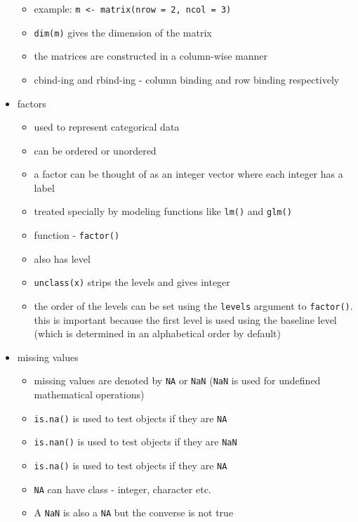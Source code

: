 \documentclass[11pt,fancy]{elegantbook}
\begin{document}
\begin{itemize}
\begin{itemize}
              \item example: \texttt{m <- matrix(nrow = 2, ncol = 3)}
              \item \texttt{dim(m)} gives the dimension of the matrix
              \item the matrices are constructed in a column-wise manner
              \item cbind-ing and rbind-ing - column binding and row binding respectively
          \end{itemize}
    \item factors
          \begin{itemize}
              \item used to represent categorical data
              \item can be ordered or unordered
              \item a factor can be thought of as an integer vector where each integer has a label
              \item treated specially by modeling functions like \texttt{lm()} and \texttt{glm()}
              \item function - \texttt{factor()}
              \item also has level
              \item \texttt{unclass(x)} strips the levels and gives integer
              \item the order of the levels can be set using the \texttt{levels} argument to \texttt{factor()}. this is important because the first level is used using the baseline level (which is determined in an alphabetical order by default)
          \end{itemize}
    \item missing values
          \begin{itemize}
              \item missing values are denoted by \texttt{NA} or \texttt{NaN} (\texttt{NaN} is used for undefined mathematical operations)
              \item \texttt{is.na()} is used to test objects if they are \texttt{NA}
              \item \texttt{is.nan()} is used to test objects if they are \texttt{NaN}
              \item \texttt{is.na()} is used to test objects if they are \texttt{NA}
              \item \texttt{NA} can have class - integer, character etc.
              \item A \texttt{NaN} is also a \texttt{NA} but the converse is not true

\end{itemize}
\end{itemize}
\end{document}
